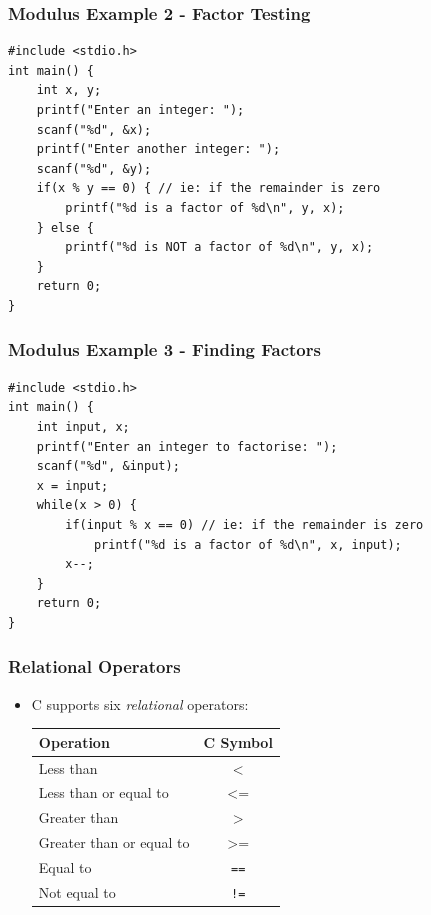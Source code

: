 \documentclass[14pt]{beamer}
\begin{document}
\begin{frame}[fragile]
\frametitle{Modulus Example 2 - Factor Testing}
\begin{lstlisting}[style=CStyle,caption=\texttt{factorTest.c}]
#include <stdio.h>
int main() {
	int x, y;
	printf("Enter an integer: ");
	scanf("%d", &x);
	printf("Enter another integer: ");
	scanf("%d", &y);
	if(x % y == 0) { // ie: if the remainder is zero
		printf("%d is a factor of %d\n", y, x);
	} else {
		printf("%d is NOT a factor of %d\n", y, x);
	}
	return 0;
}
\end{lstlisting}
\end{frame}

\begin{frame}[fragile]
\frametitle{Modulus Example 3 - Finding Factors}

\begin{lstlisting}[style=CStyle,basicstyle=\ttfamily\footnotesize,caption=\texttt{factors.c}]
#include <stdio.h>
int main() {
	int input, x;
	printf("Enter an integer to factorise: ");
	scanf("%d", &input);
	x = input;
	while(x > 0) {
		if(input % x == 0) // ie: if the remainder is zero
			printf("%d is a factor of %d\n", x, input);
		x--;
	}
	return 0;
}
\end{lstlisting}
\end{frame}

\begin{frame}
\frametitle{Relational Operators}
\begin{itemize}
\item C supports six \textit{relational} operators:
\begin{table}[H]
\centering
\begin{tabular}{|l|c|}
\hline
Operation      & C Symbol \\
\hline
Less than       & $\texttt{<}$        \\
Less than or equal to    & $\texttt{<=}$\\
Greater than & $\texttt{>}$        \\
Greater than or equal to       & $\texttt{>=}$       \\
Equal to & \texttt{==} \\
Not equal to & \texttt{!=} \\
\hline
\end{tabular}
\end{table}
\end{itemize}
\end{frame}
\end{document}
